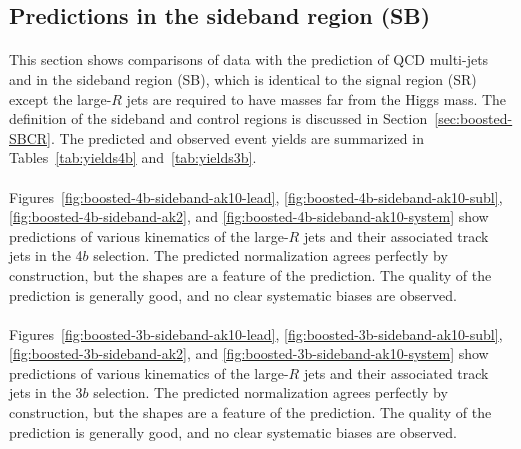 \subsection{Predictions in the sideband region (SB)}
\label{sec:boosted-sb}

\paragraph{}
This section shows comparisons of data with the prediction of QCD multi-jets and \ttbar in the sideband region (SB), which is identical to the signal region (SR) except the large-$R$ jets are required to have masses far from the Higgs mass. The definition of the sideband and control regions is discussed in Section~\ref{sec:boosted-SBCR}. The predicted and observed event yields are summarized in Tables~\ref{tab:yields4b} and~\ref{tab:yields3b}.

\paragraph{}
Figures~\ref{fig:boosted-4b-sideband-ak10-lead}, \ref{fig:boosted-4b-sideband-ak10-subl}, \ref{fig:boosted-4b-sideband-ak2},  and \ref{fig:boosted-4b-sideband-ak10-system} show predictions of various kinematics of the large-$R$ jets and their associated track jets in the 4$b$ selection. The predicted normalization agrees perfectly by construction, but the shapes are a feature of the prediction. The quality of the prediction is generally good, and no clear systematic biases are observed.


\paragraph{}
Figures~\ref{fig:boosted-3b-sideband-ak10-lead}, \ref{fig:boosted-3b-sideband-ak10-subl}, \ref{fig:boosted-3b-sideband-ak2},  and \ref{fig:boosted-3b-sideband-ak10-system} show predictions of various kinematics of the large-$R$ jets and their associated track jets in the 3$b$ selection. The predicted normalization agrees perfectly by construction, but the shapes are a feature of the prediction. The quality of the prediction is generally good, and no clear systematic biases are observed.


